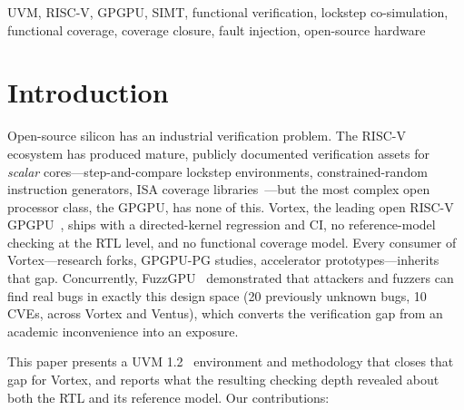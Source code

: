 \documentclass[conference]{IEEEtran}
\begin{document}
\begin{IEEEkeywords}
	UVM, RISC-V, GPGPU, SIMT, functional verification, lockstep
	co-simulation, functional coverage, coverage closure, fault injection,
	open-source hardware
\end{IEEEkeywords}

\section{Introduction}
Open-source silicon has an industrial verification problem. The RISC-V
ecosystem has produced mature, publicly documented verification assets
for \emph{scalar} cores---step-and-compare lockstep environments,
constrained-random instruction generators, ISA coverage
libraries~\cite{corevverif, riscvdv, rvvi, imperasdv, difftest}---but the
most complex open processor class, the GPGPU, has none of this. Vortex,
the leading open RISC-V GPGPU~\cite{vortex-micro, vortex-carrv}, ships
with a directed-kernel regression and CI, no reference-model checking at
the RTL level, and no functional coverage model. Every consumer of
Vortex---research forks, GPGPU-PG studies, accelerator prototypes---inherits
that gap. Concurrently, FuzzGPU~\cite{fuzzgpu} demonstrated that
attackers and fuzzers can find real bugs in exactly this design space
(20 previously unknown bugs, 10 CVEs, across Vortex and Ventus), which
converts the verification gap from an academic inconvenience into an
exposure.

This paper presents a UVM 1.2~\cite{uvm} environment and methodology
that closes that gap for Vortex, and reports what the resulting
checking depth revealed about both the RTL and its reference model. Our
contributions:
\end{document}
